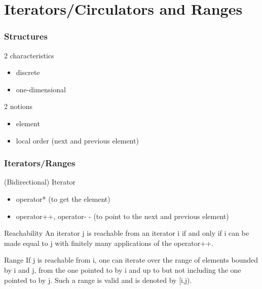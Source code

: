 \section{Iterators/Circulators and Ranges}


\begin{frame}
  \frametitle{Structures}

  \begin{block}{2 characteristics}
    \begin{itemize}
		\item discrete
    \item one-dimensional
    \end{itemize}
  \end{block}

  \begin{block}{2 notions}
    \begin{itemize}
    \item element
    \item local order (next and previous element)
    \end{itemize}
  \end{block}



\end{frame}

\begin{frame}
  \frametitle{Iterators/Ranges}

  \begin{block}{(Bidirectional) Iterator}
    \begin{itemize}
    \item operator* (to get the element)
    \item operator++, operator- - (to point to the next and previous element)
    \end{itemize}
  \end{block}

  \begin{block}{Reachability}
An iterator j is reachable from an iterator i if and only if i can be made equal to j with finitely many applications of the operator++. 
  \end{block}

  \begin{block}{Range}
If j is reachable from i, one can iterate over the range of elements bounded by i and j, from the one pointed to by i and up to but not including the one pointed to by j. Such a range is valid and is denoted by [i,j).
  \end{block}

\end{frame}

